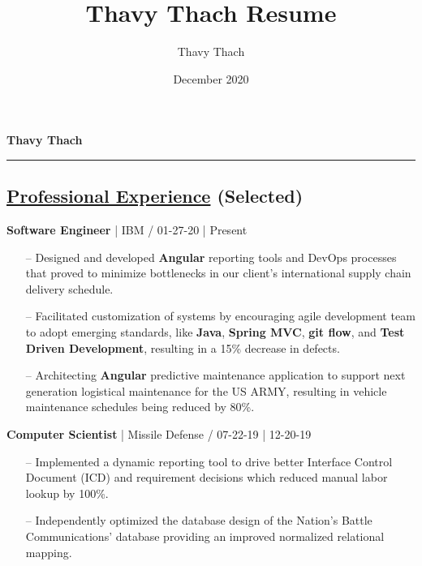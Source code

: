 \documentclass{article}
\title{Thavy Thach Resume}
\author{Thavy Thach}
\date{December 2020}
\begin{document}
\textbf{{\huge Thavy Thach}}
\newline
\noindent\rule{19cm}{0.1pt}

\begin{multicols}{2}

\section*{\underline{Professional Experience} {\small(Selected)}}

{\footnotesize{\textbf{Software Engineer} | IBM / 01-27-20 | Present}}
{\footnotesize{
\begin{itemize}
	\item[--] Designed and developed \textbf{Angular} reporting tools and DevOps processes that proved to minimize bottlenecks in our client's international supply chain delivery schedule.
	\item[--] Facilitated customization of systems by encouraging agile development team to adopt emerging standards, like \textbf{Java}, \textbf{Spring MVC}, \textbf{git flow}, and \textbf{Test Driven Development}, resulting in a 15\% decrease in defects.
	\item[--] Architecting \textbf{Angular} predictive maintenance application to support next generation logistical maintenance for the US ARMY, resulting in vehicle maintenance schedules being reduced by 80\%.  
\end{itemize}
}}
\hfill \break
{\footnotesize{\textbf{Computer Scientist} | Missile Defense / 07-22-19 | 12-20-19}}
{\footnotesize{
\begin{itemize}
	\item[--] Implemented a dynamic reporting tool to drive better Interface Control Document (ICD) and requirement decisions which reduced manual labor lookup by 100\%.
	\item[--] Independently optimized the database design of the Nation's Battle Communications' database providing an improved normalized relational mapping.
\end{itemize}
}}
\end{multicols}
\end{document}
